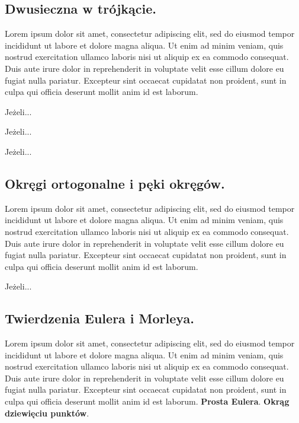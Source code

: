 \documentclass{greaseproof}
\begin{document}
\subsection{Dwusieczna w trójkącie.} Lorem ipsum dolor sit amet, consectetur adipiscing elit, sed do eiusmod tempor incididunt ut labore et dolore magna aliqua. Ut enim ad minim veniam, quis nostrud exercitation ullamco laboris nisi ut aliquip ex ea commodo consequat. Duis aute irure dolor in reprehenderit in voluptate velit esse cillum dolore eu fugiat nulla pariatur. Excepteur sint occaecat cupidatat non proident, sunt in culpa qui officia deserunt mollit anim id est laborum.
\begin{proposition}
	Jeżeli...
\end{proposition}
\begin{theorem}
	Jeżeli...
\end{theorem}
\begin{definition}
	Jeżeli...
\end{definition}

\subsection{Okręgi ortogonalne i pęki okręgów.} Lorem ipsum dolor sit amet, consectetur adipiscing elit, sed do eiusmod tempor incididunt ut labore et dolore magna aliqua. Ut enim ad minim veniam, quis nostrud exercitation ullamco laboris nisi ut aliquip ex ea commodo consequat. Duis aute irure dolor in reprehenderit in voluptate velit esse cillum dolore eu fugiat nulla pariatur. Excepteur sint occaecat cupidatat non proident, sunt in culpa qui officia deserunt mollit anim id est laborum.
\begin{theorem}[Ponceleta]
	Jeżeli...
\end{theorem}

\subsection{Twierdzenia Eulera i Morleya.} Lorem ipsum dolor sit amet, consectetur adipiscing elit, sed do eiusmod tempor incididunt ut labore et dolore magna aliqua. Ut enim ad minim veniam, quis nostrud exercitation ullamco laboris nisi ut aliquip ex ea commodo consequat. Duis aute irure dolor in reprehenderit in voluptate velit esse cillum dolore eu fugiat nulla pariatur. Excepteur sint occaecat cupidatat non proident, sunt in culpa qui officia deserunt mollit anim id est laborum.
\textbf{Prosta Eulera}.
\textbf{Okrąg dziewięciu punktów}.
\end{document}
